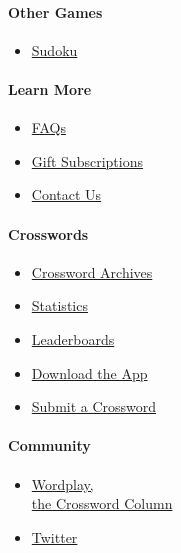 \hypertarget{other-games-1}{%
\paragraph{Other Games}\label{other-games-1}}

\begin{itemize}
\tightlist
\item
  \href{/puzzles/sudoku}{Sudoku}
\end{itemize}

\hypertarget{learn-more}{%
\paragraph{Learn More}\label{learn-more}}

\begin{itemize}
\tightlist
\item
  \href{https://help.nytimes.com/hc/en-us/articles/115014755667-New-York-Times-Crossword}{FAQs}
\item
  \href{https://nytimes.com/subscription/crosswords/gift}{Gift
  Subscriptions}
\item
  \href{mailto:NYTCrossword@nytimes.com}{Contact Us}
\end{itemize}

\hypertarget{crosswords}{%
\paragraph{Crosswords}\label{crosswords}}

\begin{itemize}
\tightlist
\item
  \href{/crosswords/archive}{Crossword Archives}
\item
  \href{/puzzles/stats}{Statistics}
\item
  \href{/puzzles/leaderboards}{Leaderboards}
\item
  \href{/crosswords/apps}{Download the App}
\item
  \href{/puzzles/submissions/crossword}{Submit a Crossword}
\end{itemize}

\hypertarget{community}{%
\paragraph{Community}\label{community}}

\begin{itemize}
\tightlist
\item
  \href{https://nytimes.com/column/wordplay}{Wordplay,\\
  the Crossword Column}
\item
  \href{https://twitter.com/NYTimesWordplay}{Twitter}
\end{itemize}

